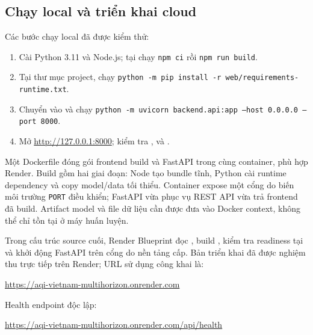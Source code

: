 \documentclass[11pt,a4paper]{article}
\begin{document}
\subsection{Chạy local và triển khai cloud}
Các bước chạy local đã được kiểm thử:
\begin{enumerate}
\item Cài Python 3.11 và Node.js; tại  chạy \texttt{npm ci} rồi \texttt{npm run build}.
\item Tại thư mục project, chạy \texttt{python -m pip install -r web/requirements-runtime.txt}.
\item Chuyển vào  và chạy \texttt{python -m uvicorn backend.api:app --host 0.0.0.0 --port 8000}.
\item Mở \url{http://127.0.0.1:8000}; kiểm tra ,  và .
\end{enumerate}
Một Dockerfile đóng gói frontend build và FastAPI trong cùng container, phù hợp Render. Build gồm hai giai đoạn: Node tạo bundle tĩnh, Python cài runtime dependency và copy model/data tối thiểu. Container expose một cổng do biến môi trường \texttt{PORT} điều khiển; FastAPI vừa phục vụ REST API vừa trả frontend đã build. Artifact model và file dữ liệu cần được đưa vào Docker context, không thể chỉ tồn tại ở máy huấn luyện.

Trong cấu trúc source cuối, Render Blueprint đọc , build , kiểm tra readiness tại  và khởi động FastAPI trên cổng do nền tảng cấp. Bản triển khai đã được nghiệm thu trực tiếp trên Render; URL sử dụng công khai là:

\begin{center}
\url{https://aqi-vietnam-multihorizon.onrender.com}
\end{center}

Health endpoint độc lập:
\begin{center}
\url{https://aqi-vietnam-multihorizon.onrender.com/api/health}
\end{center}
\end{document}
